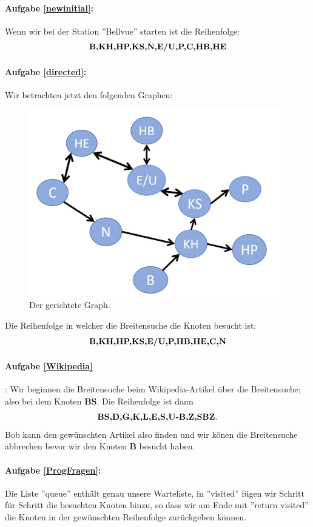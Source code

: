 \paragraph{ Aufgabe \ref{newinitial}:} Wenn wir bei der Station ''Bellvue'' starten ist die Reihenfolge: $$ \text{\bf{B,KH,HP,KS,N,E/U,P,C,HB,HE}}$$

\paragraph{Aufgabe \ref{directed}:} Wir betrachten jetzt den folgenden Graphen:\\
\begin{figure}[H]
    \centering
    \includegraphics[scale=0.3]{Pictures/directedTram.PNG} 
    \caption{Der gerichtete Graph.}
    \label{fig:my_label}
\end{figure}
Die Reihenfolge in welcher die Breitensuche die Knoten besucht ist:
$$ \text{\bf{B,KH,HP,KS,E/U,P,HB,HE,C,N}}$$

\paragraph{Aufgabe \ref{Wikipedia}}: Wir beginnen die Breitensuche beim Wikipedia-Artikel über die Breitensuche; also bei dem Knoten {\bf{BS}}. Die Reihenfolge ist dann
$$ \text{\bf{BS,D,G,K,L,E,S,U-B,Z,SBZ}}.$$
Bob kann den gewünschten Artikel also finden und wir könen die Breitensuche abbrechen bevor wir den Knoten {\bf{B}} besucht haben.

\paragraph{Aufgabe \ref{ProgFragen}:} Die Liste ''queue'' enthält genau unsere Warteliste, in ''visited'' fügen wir Schritt für Schritt die besuchten Knoten hinzu, so dass wir am Ende mit ''return visited'' die Knoten in der gewünschten Reihenfolge zurückgeben können.

